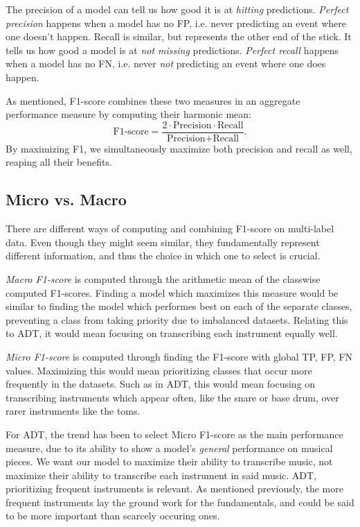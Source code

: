 The precision of a model can tell us how good it is at \textit{hitting} predictions. \textit{Perfect precision} happens when a model has no \gls{FP}, i.e. never predicting an event where one doesn't happen. Recall is similar, but represents the other end of the stick. It tells us how good a model is at \textit{not missing} predictions. \textit{Perfect recall} happens when a model has no \gls{FN}, i.e. never \textit{not} predicting an event where one does happen.

As mentioned, F1-score combines these two measures in an aggregate performance measure by computing their harmonic mean: $$ \text{F1-score} = \frac{2 \cdot \text{Precision} \cdot \text{Recall}}{\text{Precision} + \text{Recall}}. $$ By maximizing F1, we simultaneously maximize both precision and recall as well, reaping all their benefits.

\subsection{Micro vs. Macro}

There are different ways of computing and combining F1-score on multi-label data. Even though they might seem similar, they fundamentally represent different information, and thus the choice in which one to select is crucial.

\textit{Macro F1-score} is computed through the arithmetic mean of the classwise computed F1-scores. Finding a model which maximizes this measure would be similar to finding the model which performes best on each of the separate classes, preventing a class from taking priority due to imbalanced datasets. Relating this to \gls{ADT}, it would mean focusing on transcribing each instrument equally well.

\textit{Micro F1-score} is computed through finding the F1-score with global \gls{TP}, \gls{FP}, \gls{FN} values. Maximizing this would mean prioritizing classes that occur more frequently in the datasets. Such as in \gls{ADT}, this would mean focusing on transcribing instruments which appear often, like the snare or base drum, over rarer instruments like the toms.

For \gls{ADT}, the trend has been to select Micro F1-score as the main performance measure, due to its ability to show a model's \textit{general} performance on musical pieces. We want our model to maximize their ability to transcribe music, not maximize their ability to transcribe each instrument in said music. \gls{ADT}, prioritizing frequent instruments is relevant. As mentioned previously, the more frequent instruments lay the ground work for the fundamentals, and could be said to be more important than scarcely occuring ones.

